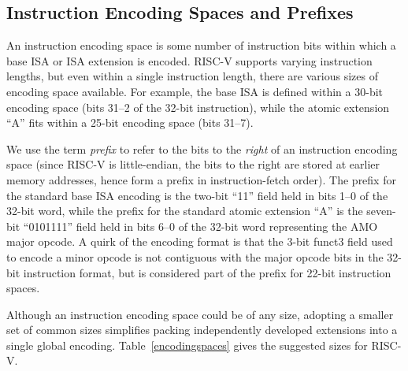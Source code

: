 \vspace{-0.2in}
\subsection*{Instruction Encoding Spaces and Prefixes}

An instruction encoding space is some number of instruction bits
within which a base ISA or ISA extension is encoded.  RISC-V supports
varying instruction lengths, but even within a single instruction
length, there are various sizes of encoding space available.  For
example, the base ISA is defined within a 30-bit encoding space (bits
31--2 of the 32-bit instruction), while the atomic extension ``A''
fits within a 25-bit encoding space (bits 31--7).

We use the term {\em prefix} to refer to the bits to the {\em right}
of an instruction encoding space (since RISC-V is little-endian, the
bits to the right are stored at earlier memory addresses, hence form a
prefix in instruction-fetch order).  The prefix for the standard base
ISA encoding is the two-bit ``11'' field held in bits 1--0 of the
32-bit word, while the prefix for the standard atomic extension ``A''
is the seven-bit ``0101111'' field held in bits 6--0 of the 32-bit
word representing the AMO major opcode.  A quirk of the encoding
format is that the 3-bit funct3 field used to encode a minor opcode is
not contiguous with the major opcode bits in the 32-bit instruction
format, but is considered part of the prefix for 22-bit instruction
spaces.

Although an instruction encoding space could be of any size, adopting
a smaller set of common sizes simplifies packing independently
developed extensions into a single global encoding.
Table~\ref{encodingspaces} gives the suggested sizes for RISC-V.

